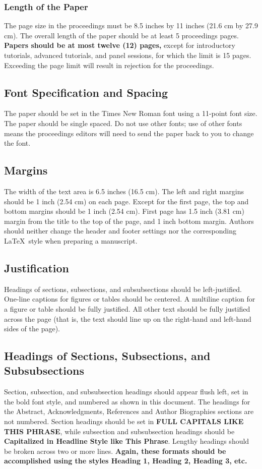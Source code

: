 \documentclass{article}
\begin{document}
\subsubsection{Length of the Paper}
The page size in the proceedings must be 8.5 inches by 11 inches (21.6 cm by 27.9 cm). The overall length of the paper should be at least 5 proceedings pages. \textbf{Papers should be at most twelve (12) pages,} except for introductory tutorials, advanced tutorials, and panel sessions, for which the limit is 15 pages. Exceeding the page limit will result in rejection for the proceedings.

\subsection{Font Specification and Spacing}
The paper should be set in the Times New Roman font using a 11-point font size. The paper should be single spaced. Do not use other fonts; use of other fonts means the proceedings editors will need to send the paper back to you to change the font.

\subsection{Margins}
\label{sec:margins}
The width of the text area is 6.5 inches (16.5 cm). The left and right margins should be 1 inch (2.54 cm) on each page. Except for the first page, the top and bottom margins should be 1 inch (2.54 cm). First page has 1.5 inch (3.81 cm) margin from the title to the top of the page, and 1 inch bottom margin. Authors should neither change the header and footer settings nor the corresponding \LaTeX\ style when preparing a manuscript.

\subsection{Justification}
Headings of sections, subsections, and subsubsections should be left-justified. One-line captions for figures or tables should be centered. A multiline caption for a figure or table should be fully justified. All other text should be fully justified across the page (that is, the text should line up on the right-hand and left-hand sides of the page).

\subsection{Headings of Sections, Subsections, and Subsubsections}
Section, subsection, and subsubsection headings should appear flush left, set in the bold font style, and numbered as shown in this document. The headings for the Abstract, Acknowledgments, References and Author Biographies sections are not numbered. Section headings should be set in \textbf{FULL CAPITALS LIKE THIS PHRASE}, while subsection and subsubsection headings should be \textbf{Capitalized in Headline Style like This Phrase}. Lengthy headings should be broken across two or more lines. \textbf{Again, these formats should be accomplished using the styles Heading 1, Heading 2, Heading 3, etc.}
\end{document}
